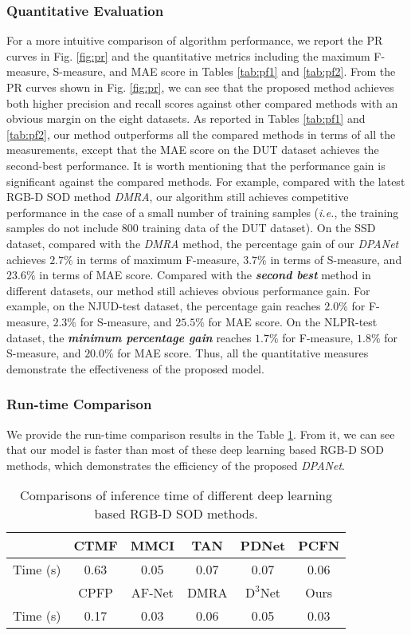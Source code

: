 \documentclass[journal]{IEEEtran}
\def\OURNET{\textit{DPANet}}
\begin{document}
\subsubsection{\textbf{Quantitative Evaluation}}
For a more intuitive comparison of algorithm performance, we report the PR curves in Fig. \ref{fig:pr} and the quantitative metrics including the maximum F-measure, S-measure, and MAE score in Tables \ref{tab:pf1} and \ref{tab:pf2}. From the PR curves shown in Fig. \ref{fig:pr}, we can see that the proposed method achieves both higher precision and recall scores against other compared methods with an obvious margin on the eight datasets. As reported in Tables \ref{tab:pf1} and \ref{tab:pf2}, our method outperforms all the compared methods in terms of all the measurements, except that the MAE score on the DUT dataset achieves the second-best performance. It is worth mentioning that the performance gain is significant against the compared methods. For example, compared with the latest RGB-D SOD method \emph{DMRA}, our algorithm still achieves competitive performance in the case of a small number of training samples (\emph{i.e.}, the training samples do not include $800$ training data of the DUT dataset). On the SSD dataset, compared with the \emph{DMRA} method, the percentage gain of our \textit{DPANet} achieves $2.7\%$ in terms of maximum F-measure, $3.7\%$ in terms of S-measure, and $23.6\%$ in terms of MAE score. Compared with the \textbf{\emph{second best}} method in different datasets, our method still achieves obvious performance gain. For example, on the NJUD-test dataset, the percentage gain reaches $2.0\%$ for F-measure, $2.3\%$ for S-measure, and $25.5\%$ for MAE score. On the NLPR-test dataset, the \textbf{\emph{minimum percentage gain}} reaches $1.7\%$ for F-measure, $1.8\%$ for S-measure, and $20.0\%$ for MAE score.
Thus, all the quantitative measures demonstrate the effectiveness of the proposed model. \\


\subsubsection{\textbf{Run-time Comparison}}
We provide the run-time comparison results in the Table \ref{tab:speed}. From it, we can see that our model is faster than most of these deep learning based RGB-D SOD methods, which demonstrates the efficiency of the proposed \OURNET.
\begin{table}[!t]
    \centering
    \normalsize
    \caption{Comparisons of inference time of different deep learning based RGB-D SOD methods.}
    \begin{tabular}{|c|c|c|c|c|c|}
    \hline
         & CTMF & MMCI & TAN & PDNet & PCFN   \\
    \hline
     Time (s) & 0.63 & 0.05 & 0.07 & 0.07 & 0.06  \\
     \hline
         & CPFP & AF-Net & DMRA & $\text{D}^3$Net & Ours  \\
     \hline
     Time (s) & 0.17 & 0.03 & 0.06 & 0.05 & 0.03 \\
     \hline
    \end{tabular}
    \label{tab:speed}
\end{table}
\end{document}
